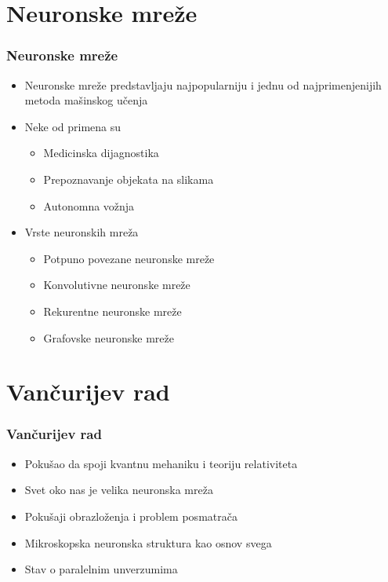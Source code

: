 \documentclass{beamer}
\begin{document}
\section{Neuronske mreže}
    \begin{frame}[fragile]\frametitle{Neuronske mreže}
	   \begin{itemize}	
            \item Neuronske mreže predstavljaju najpopularniju i jednu od najprimenjenijih metoda mašinskog učenja
            \item Neke od primena su
            \begin{itemize}
                \item Medicinska dijagnostika
                \item Prepoznavanje objekata na slikama
                \item Autonomna vožnja
            \end{itemize}
		  \item Vrste neuronskih mreža
            \begin{itemize}
                \item Potpuno povezane neuronske mreže
                \item Konvolutivne neuronske mreže
                \item Rekurentne neuronske mreže
                \item Grafovske neuronske mreže
            \end{itemize}
	   \end{itemize}
    \end{frame}

\section{Vančurijev rad}
    \begin{frame}[fragile]\frametitle{Vančurijev rad}
        \begin{itemize}
            \item Pokušao da spoji kvantnu mehaniku i teoriju relativiteta
            \item Svet oko nas je velika neuronska mreža
            \item Pokušaji obrazloženja i problem posmatrača
            \item Mikroskopska neuronska struktura kao osnov svega
            \item Stav o paralelnim unverzumima
        \end{itemize}
    \end{frame}
\end{document}

